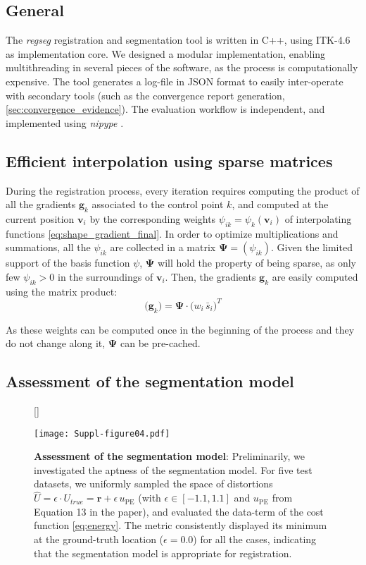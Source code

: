 \documentclass[a4paper]{report}
\renewcommand{\vec}[1]{\mathbf{#1}}
\begin{document}
\subsection{General} The \emph{regseg} registration and segmentation tool is written in C++, using ITK-4.6
  \citep{ibanez_itk_2005} as  implementation core.
We designed a modular implementation, enabling multithreading in several pieces of the software,
  as the process is computationally expensive.
The tool generates a log-file in JSON format to easily inter-operate with secondary tools (such
  as the convergence report generation, \autoref{sec:convergence_evidence}).
The evaluation workflow is independent, and implemented using \emph{nipype} \citep{gorgolewski_nipype_2011}.

\subsection{Efficient interpolation using sparse matrices}
During the registration process, every iteration requires computing the product of all the gradients
  $\vec{g}_k$ associated to the control point $k$, and computed at the current position
  $\vec{v}_i$ by the corresponding weights $\psi_{ik} = \psi_k(\mathbf{v}_i)$ of interpolating functions
  \eqref{eq:shape_gradient_final}.
In order to optimize multiplications and summations, all the $\psi_{ik}$ are collected in a
  matrix $\boldsymbol{\Psi} = (\psi_{ik})$.
Given the limited support of the basis function $\psi$, $\boldsymbol{\Psi}$ will hold the property
  of being sparse, as only few $\psi_{ik} > 0$ in the surroundings of $\vec{v}_i$.
Then, the gradients $\vec{g}_k$ are easily computed using the matrix product:
\begin{equation}
  \big(\vec{g}_k \big) = \boldsymbol{\Psi} \cdot \big( w_i \, \bar{s}_i \big)^T
  \label{eq:sparse_matrix}
\end{equation}

As these weights can be computed once in the beginning of the process and they do not change along
  it, $\boldsymbol{\Psi}$ can be pre-cached.

\subsection{Assessment of the segmentation model}
\begin{figure}[!ht]
  [\FBwidth]
  {\caption{\textbf{Assessment of the segmentation model}: 
  Preliminarily, we investigated the aptness of the segmentation model.
  For five test datasets, we uniformly sampled the space of distortions
    $\hat{U} = \epsilon \cdot U_{true} = \vec{r} + \epsilon \, u_\text{PE}$
    (with $\epsilon \in [-1.1, 1.1]$ and $u_\text{PE}$ from Equation 13 in the
    paper), and evaluated the data-term of the cost function \eqref{eq:energy}.
  The metric consistently displayed its minimum at the ground-truth location ($\epsilon=0.0$)
    for all the cases, indicating that the segmentation model is appropriate for
    registration.}}
  {\texttt{[image: Suppl-figure04.pdf]}}
  \label{fig:energymap}
\end{figure}
\end{document}

